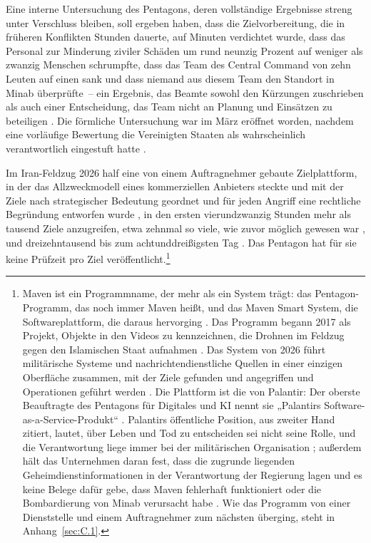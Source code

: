 Eine interne Untersuchung des Pentagons, deren vollständige Ergebnisse streng unter Verschluss bleiben, soll ergeben haben, dass die Zielvorbereitung, die in früheren Konflikten Stunden dauerte, auf Minuten verdichtet wurde, dass das Personal zur Minderung ziviler Schäden um rund neunzig Prozent auf weniger als zwanzig Menschen schrumpfte, dass das Team des Central Command von zehn Leuten auf einen sank und dass niemand aus diesem Team den Standort in Minab überprüfte~– ein Ergebnis, das Beamte sowohl den Kürzungen zuschrieben als auch einer Entscheidung, das Team nicht an Planung und Einsätzen zu beteiligen \autocite{Bloomberg2026KillChain}. Die förmliche Untersuchung war im März eröffnet worden, nachdem eine vorläufige Bewertung die Vereinigten Staaten als wahrscheinlich verantwortlich eingestuft hatte \autocite{NPR2026MinabProbe}.

Im Iran-Feldzug 2026 half eine von einem Auftragnehmer gebaute Zielplattform, in der das Allzweckmodell eines kommerziellen Anbieters steckte und mit der Ziele nach strategischer Bedeutung geordnet und für jeden Angriff eine rechtliche Begründung entworfen wurde \autocite{livingstone2026maven}, in den ersten vierundzwanzig Stunden mehr als tausend Ziele anzugreifen, etwa zehnmal so viele, wie zuvor möglich gewesen war \autocite{csis2026maven}, und dreizehntausend bis zum achtunddreißigsten Tag \autocite{breakingdefense2026maven}. Das Pentagon hat für sie keine Prüfzeit pro Ziel veröffentlicht.\footnote{Maven ist ein Programmname, der mehr als ein System trägt: das Pentagon-Programm, das noch immer Maven heißt, und das Maven Smart System, die Softwareplattform, die daraus hervorging \autocite{csis2026maven}. Das Programm begann 2017 als Projekt, Objekte in den Videos zu kennzeichnen, die Drohnen im Feldzug gegen den Islamischen Staat aufnahmen \autocite{weisgerber2017maven,fang2019maven}. Das System von 2026 führt militärische Systeme und nachrichtendienstliche Quellen in einer einzigen Oberfläche zusammen, mit der Ziele gefunden und angegriffen und Operationen geführt werden \autocite{defensescoop2026transition}. Die Plattform ist die von Palantir: Der oberste Beauftragte des Pentagons für Digitales und KI nennt sie „Palantirs Software-as-a-Service-Produkt“ \autocite{defensescoop2026transition}. Palantirs öffentliche Position, aus zweiter Hand zitiert, lautet, über Leben und Tod zu entscheiden sei nicht seine Rolle, und die Verantwortung liege immer bei der militärischen Organisation \autocite{lee2026palantir}; außerdem hält das Unternehmen daran fest, dass die zugrunde liegenden Geheimdienstinformationen in der Verantwortung der Regierung lagen und es keine Belege dafür gebe, dass Maven fehlerhaft funktioniert oder die Bombardierung von Minab verursacht habe \autocite{Bloomberg2026KillChain}. Wie das Programm von einer Dienststelle und einem Auftragnehmer zum nächsten überging, steht in Anhang~\ref{sec:C.1}.}

